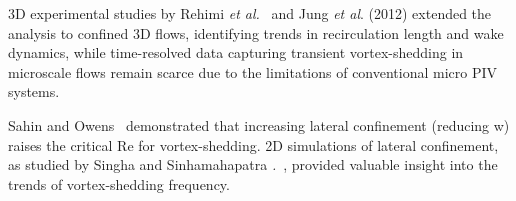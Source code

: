 3D experimental studies by Rehimi\textit{ et al.}~\cite{rehimi} and Jung \textit{et al}. (2012) extended the analysis to confined 3D flows, identifying trends in recirculation length and wake dynamics, while time-resolved data capturing transient vortex-shedding in microscale flows remain scarce due to the limitations of conventional micro PIV systems.

Sahin and Owens~\cite{SAHIN2004121} demonstrated that increasing lateral confinement (reducing w) raises the critical Re for vortex-shedding. 2D simulations of lateral confinement, as studied by Singha and Sinhamahapatra \textit.~\cite{SINGHA2010757}, provided valuable insight into the trends of vortex-shedding frequency.







